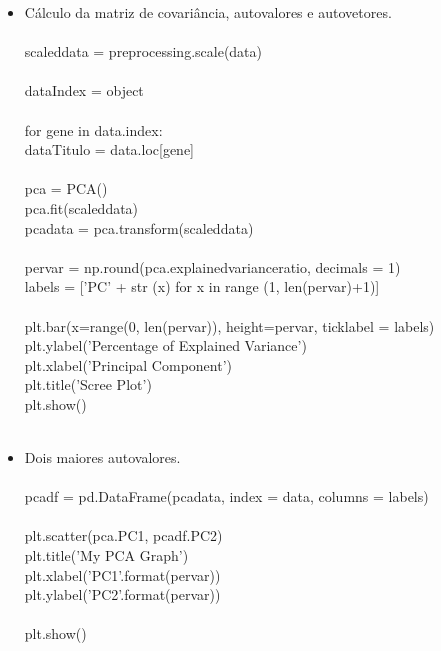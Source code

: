 \documentclass{article}
\begin{document}
\begin{itemize}
\item Cálculo da matriz de covariância, autovalores e autovetores.\\ \\
scaled\textunderscore data = preprocessing.scale(data)\\ \\
dataIndex = object\\ \\
for gene in data.index:\\
    dataTitulo = data.loc[gene] \\ \\
pca = PCA()\\
pca.fit(scaled\textunderscore data)\\
pca\textunderscore data = pca.transform(scaled\textunderscore data)\\ \\
per\textunderscore var = np.round(pca.explained\textunderscore variance\textunderscore ratio, decimals = 1)\\
labels = ['PC' + str (x) for x in range (1, len(per\textunderscore var)+1)]\\ \\
plt.bar(x=range(0, len(per\textunderscore var)), height=per\textunderscore var, tick\textunderscore label = labels)\\
plt.ylabel('Percentage of Explained Variance')\\
plt.xlabel('Principal Component')\\
plt.title('Scree Plot')\\
plt.show()\\ \\
\end{itemize}

\begin{itemize}
\item Dois maiores autovalores.\\ \\
pca\textunderscore df = pd.DataFrame(pca\textunderscore data, index = data, columns = labels)\\ \\
plt.scatter(pca\textunderscoredf.PC1, pca\textunderscore df.PC2)\\
plt.title('My PCA Graph')\\
plt.xlabel('PC1'.format(per\textunderscore var))\\
plt.ylabel('PC2'.format(per\textunderscore var))\\ \\
plt.show()\\ \\
\end{itemize}
\end{document}
